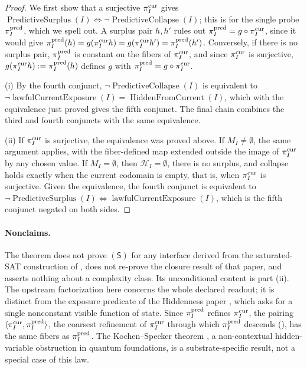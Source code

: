 \begin{proof}
We first show that a surjective \(\pi^{\mathrm{cur}}_I\) gives
\(\operatorname{PredictiveSurplus}(I)\iff\neg\operatorname{PredictiveCollapse}(I)\);
this is  for the single probe \(\pi^{\mathrm{pred}}_I\), which we spell
out.  A surplus pair \(h,h'\) rules out \(\pi^{\mathrm{pred}}_I=g\circ\pi^{\mathrm{cur}}_I\),
since it would give
\(\pi^{\mathrm{pred}}_I(h)=g(\pi^{\mathrm{cur}}_I h)=g(\pi^{\mathrm{cur}}_I h')=\pi^{\mathrm{pred}}_I(h')\).  Conversely,
if there is no surplus pair, \(\pi^{\mathrm{pred}}_I\) is constant on the fibers of
\(\pi^{\mathrm{cur}}_I\), and since \(\pi^{\mathrm{cur}}_I\) is surjective,
\(g(\pi^{\mathrm{cur}}_I h):=\pi^{\mathrm{pred}}_I(h)\) defines \(g\) with
\(\pi^{\mathrm{pred}}_I=g\circ\pi^{\mathrm{cur}}_I\).

(i) By the fourth conjunct, \(\neg\operatorname{PredictiveCollapse}(I)\)
is equivalent to
\(\neg\operatorname{lawfulCurrentExposure}(I)=\operatorname{HiddenFromCurrent}(I)\),
which with the equivalence just proved gives the fifth conjunct.  The
final chain combines the third and fourth conjuncts with the same
equivalence.

(ii) If \(\pi^{\mathrm{cur}}_I\) is surjective, the equivalence was proved above.
If \(M_I\ne\emptyset\), the same argument applies, with the
fiber-defined map extended outside the image of \(\pi^{\mathrm{cur}}_I\) by any
chosen value.  If \(M_I=\emptyset\), then \(\mathcal H_I=\emptyset\),
there is no surplus, and collapse holds exactly when the current
codomain is empty, that is, when \(\pi^{\mathrm{cur}}_I\) is surjective.  Given the
equivalence, the fourth conjunct is equivalent to
\(\neg\operatorname{PredictiveSurplus}(I)\iff\operatorname{lawfulCurrentExposure}(I)\),
which is the fifth conjunct negated on both sides.
\end{proof}

\paragraph{Nonclaims.} The theorem does not prove \((\mathsf S)\) for
any interface derived from the saturated-SAT construction of
\citet{Tsiokos2026PvNP}, does not re-prove the closure result of that
paper, and asserts nothing about a complexity class.  Its unconditional
content is part (ii).  The upstream factorization here concerns the
whole declared readout; it is distinct from the exposure predicate of
the Hiddenness paper \citep{Tsiokos2026CSL}, which asks for a single
nonconstant visible function of state.  Since \(\pi^{\mathrm{pred}}_I\) refines
\(\pi^{\mathrm{cur}}_I\), the pairing \(\langle\pi^{\mathrm{cur}}_I,\pi^{\mathrm{pred}}_I\rangle\), the
coarsest refinement of \(\pi^{\mathrm{cur}}_I\) through which \(\pi^{\mathrm{pred}}_I\) descends
(), has the same fibers as \(\pi^{\mathrm{pred}}_I\).  The
Kochen--Specker theorem \citep{KochenSpecker1967Hidden}, a
non-contextual hidden-variable obstruction in quantum foundations, is
a substrate-specific result, not a special case of this law.

